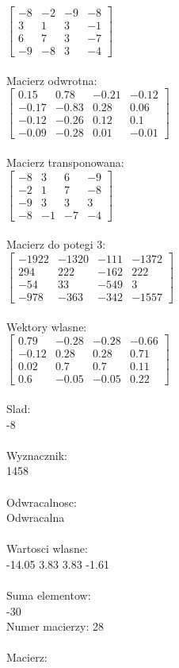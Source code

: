 \documentclass[a4paper,12pt]{article}
\begin{document}
$\begin{bmatrix} -8&-2&-9&-8\\3&1&3&-1\\6&7&3&-7\\-9&-8&3&-4 \end{bmatrix}$
\\
\\
Macierz odwrotna:\\

$\begin{bmatrix} 0.15&0.78&-0.21&-0.12\\-0.17&-0.83&0.28&0.06\\-0.12&-0.26&0.12&0.1\\-0.09&-0.28&0.01&-0.01 \end{bmatrix}$
\\
\\
Macierz transponowana:\\

$\begin{bmatrix} -8&3&6&-9\\-2&1&7&-8\\-9&3&3&3\\-8&-1&-7&-4 \end{bmatrix}$
\\
\\
Macierz do potegi 3:\\

$\begin{bmatrix} -1922&-1320&-111&-1372\\294&222&-162&222\\-54&33&-549&3\\-978&-363&-342&-1557 \end{bmatrix}$
\\
\\
Wektory wlasne:\\

$\begin{bmatrix} 0.79&-0.28&-0.28&-0.66\\-0.12&0.28&0.28&0.71\\0.02&0.7&0.7&0.11\\0.6&-0.05&-0.05&0.22 \end{bmatrix}$
\\
\\
Slad:\\
-8
\\
\\
Wyznacznik:\\
1458
\\
\\
Odwracalnosc:\\
Odwracalna
\\
\\
Wartosci wlasne:\\
-14.05 3.83 3.83 -1.61
\\
\\
Suma elementow:\\
-30
\\
\newpage
Numer macierzy:
28
\\
\\
Macierz:\\
\end{document}
